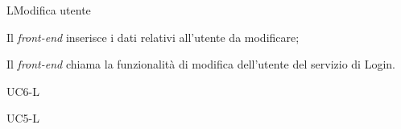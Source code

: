 \begin{usecase}{4}{L}{Modifica utente}
	
	
	
	\begin{ucscenarioprincipale}
		\item Il \textit{front-end} inserisce i dati relativi all'utente da modificare;
		\item Il \textit{front-end} chiama la funzionalità di modifica dell'utente del servizio di Login.
	\end{ucscenarioprincipale}


	\begin{ucestensioni}
		\item UC6-L
	\end{ucestensioni}
	
	\begin{ucgeneralizzazioni}
		\item UC5-L
	\end{ucgeneralizzazioni}
	
	\label{uc:modifica-utente-l}
\end{usecase}

